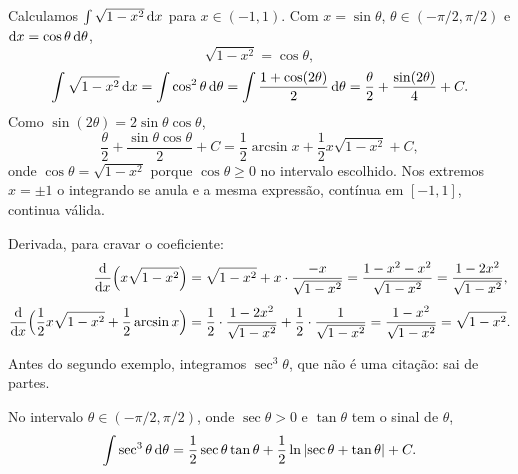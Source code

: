 \documentclass[11pt,a4paper]{article}
\begin{document}

\begin{exemplo}[Família \(\sqrt{a^{2}-x^{2}}\), com \(a=1\)]
Calculamos \(\int\sqrt{1-x^{2}}\,\mathrm{d} x\) para \(x\in(-1,1)\). Com \(x=\sin\theta\), \(\theta\in(-\pi/2,\pi/2)\) e \(\mathrm{d} x=\cos\theta\,\mathrm{d}\theta\),
\[
\sqrt{1-x^{2}}=\cos\theta,
\]
\[
\int\sqrt{1-x^{2}}\,\mathrm{d} x
=\int\cos^{2}\theta\,\mathrm{d}\theta
=\int\frac{1+\cos(2\theta)}{2}\,\mathrm{d}\theta
=\frac{\theta}{2}+\frac{\sin(2\theta)}{4}+C.
\]
Como \(\sin(2\theta)=2\sin\theta\cos\theta\),
\[
\frac{\theta}{2}+\frac{\sin\theta\cos\theta}{2}+C
=\frac12\arcsin x+\frac12 x\sqrt{1-x^{2}}+C,
\]
onde \(\cos\theta=\sqrt{1-x^{2}}\) porque \(\cos\theta\ge 0\) no intervalo escolhido. Nos extremos \(x=\pm 1\) o integrando se anula e a mesma expressão, contínua em \([-1,1]\), continua válida.

Derivada, para cravar o coeficiente:
\begin{align*}
\frac{\mathrm{d}}{\mathrm{d} x}\Bigl(x\sqrt{1-x^{2}}\Bigr)
&=\sqrt{1-x^{2}}+x\cdot\frac{-x}{\sqrt{1-x^{2}}}
=\frac{1-x^{2}-x^{2}}{\sqrt{1-x^{2}}}
=\frac{1-2x^{2}}{\sqrt{1-x^{2}}},\\[0.4em]
\frac{\mathrm{d}}{\mathrm{d} x}\Bigl(\frac12 x\sqrt{1-x^{2}}+\frac12\arcsin x\Bigr)
&=\frac12\cdot\frac{1-2x^{2}}{\sqrt{1-x^{2}}}+\frac12\cdot\frac{1}{\sqrt{1-x^{2}}}
=\frac{1-x^{2}}{\sqrt{1-x^{2}}}
=\sqrt{1-x^{2}}.
\end{align*}
\end{exemplo}

Antes do segundo exemplo, integramos \(\sec^{3}\theta\), que não é uma citação: sai de partes.

\begin{lema}
No intervalo \(\theta\in(-\pi/2,\pi/2)\), onde \(\sec\theta>0\) e \(\tan\theta\) tem o sinal de \(\theta\),
\[
\int\sec^{3}\theta\,\mathrm{d}\theta
=\frac12\sec\theta\tan\theta+\frac12\ln\left\lvert \sec\theta+\tan\theta \right\rvert+C.
\]
\end{lema}
\end{document}
